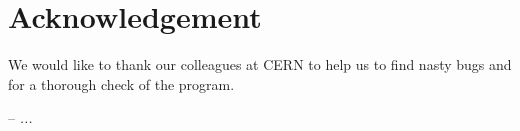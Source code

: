 \chapter*{Acknowledgement}

We would like to thank our colleagues at CERN to help us to find nasty bugs and for a thorough check of the program.

\bigskip
\begin{flushright}
    -- \textit{...}
\end{flushright}
